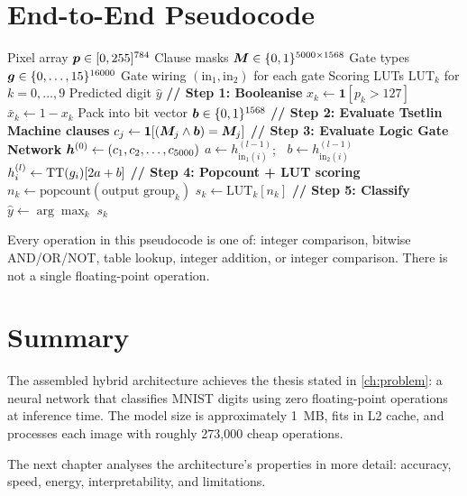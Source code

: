 \section{End-to-End Pseudocode}
\label{sec:pseudocode}

\begin{algorithm}[htbp]
\caption{Complete hybrid inference for one MNIST image.}
\label{alg:full-inference}
\begin{algorithmic}[1]
  \Require Pixel array $\bm{p} \in [0,255]^{784}$
  \Require Clause masks $\bm{M} \in \{0,1\}^{5000 \times 1568}$
  \Require Gate types $\bm{g} \in \{0,\ldots,15\}^{16000}$
  \Require Gate wiring $(\text{in}_1, \text{in}_2)$ for each gate
  \Require Scoring LUTs $\text{LUT}_k$ for $k = 0, \ldots, 9$
  \Ensure Predicted digit $\hat{y}$
  \Statex
  \State \textbf{// Step 1: Booleanise}
    \State $x_k \leftarrow \mathbf{1}[p_k > 127]$
    \State $\bar{x}_k \leftarrow 1 - x_k$
  \EndFor
  \State Pack into bit vector $\bm{b} \in \{0,1\}^{1568}$
  \Statex
  \State \textbf{// Step 2: Evaluate Tsetlin Machine clauses}
    \State $c_j \leftarrow \mathbf{1}[(\bm{M}_j \wedge \bm{b}) = \bm{M}_j]$
  \EndFor
  \Statex
  \State \textbf{// Step 3: Evaluate Logic Gate Network}
  \State $\bm{h}^{(0)} \leftarrow (c_1, c_2, \ldots, c_{5000})$
      \State $a \leftarrow h^{(l-1)}_{\text{in}_1(i)}$;
        $\;\; b \leftarrow h^{(l-1)}_{\text{in}_2(i)}$
      \State $h^{(l)}_i \leftarrow \operatorname{TT}(g_i)[2a + b]$
    \EndFor
  \EndFor
  \Statex
  \State \textbf{// Step 4: Popcount + LUT scoring}
    \State $n_k \leftarrow \text{popcount}(\text{output group}_k)$
    \State $s_k \leftarrow \text{LUT}_k[n_k]$
  \EndFor
  \Statex
  \State \textbf{// Step 5: Classify}
  \State $\hat{y} \leftarrow \arg\max_k \; s_k$
\end{algorithmic}
\end{algorithm}

Every operation in this pseudocode is one of: integer comparison,
bitwise AND/OR/NOT, table lookup, integer addition, or integer
comparison. There is not a single floating-point operation.


\section{Summary}
\label{sec:ch12-summary}

The assembled hybrid architecture achieves the thesis stated in
\cref{ch:problem}: a neural network that classifies MNIST digits
using zero floating-point operations at inference time. The model
size is approximately 1~MB, fits in L2 cache, and processes each
image with roughly 273,000 cheap operations.

The next chapter analyses the architecture's properties in more
detail: accuracy, speed, energy, interpretability, and limitations.
